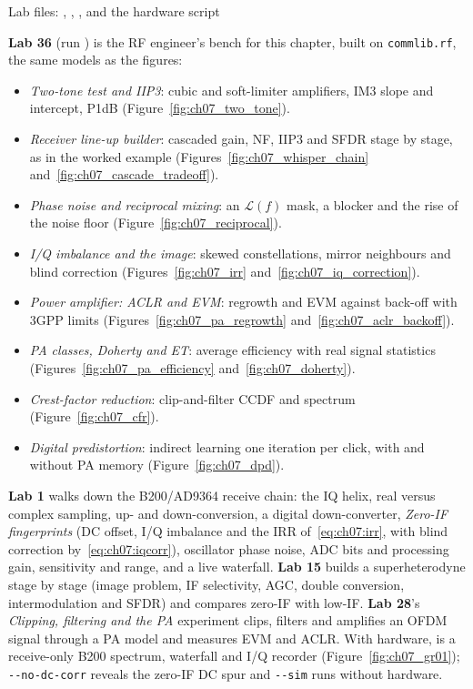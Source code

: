 \begin{labbox}
{\raggedright Lab files: ,
, ,  and the
hardware script \par}
\smallskip
\noindent\textbf{Lab 36} (run ) is the RF engineer's bench for this
chapter, built on \texttt{commlib.rf}, the same models as the figures:
\begin{itemize}
\item \emph{Two-tone test and IIP3}: cubic and soft-limiter amplifiers, IM3 slope and intercept, P1dB
(Figure~\ref{fig:ch07_two_tone}).
\item \emph{Receiver line-up builder}: cascaded gain, NF, IIP3 and SFDR stage by stage, as in the worked
example (Figures~\ref{fig:ch07_whisper_chain} and~\ref{fig:ch07_cascade_tradeoff}).
\item \emph{Phase noise and reciprocal mixing}: an $\mathcal L(f)$ mask, a blocker and the rise of the
noise floor (Figure~\ref{fig:ch07_reciprocal}).
\item \emph{I/Q imbalance and the image}: skewed constellations, mirror neighbours and blind correction
(Figures~\ref{fig:ch07_irr} and~\ref{fig:ch07_iq_correction}).
\item \emph{Power amplifier: ACLR and EVM}: regrowth and EVM against back-off with 3GPP limits
(Figures~\ref{fig:ch07_pa_regrowth} and~\ref{fig:ch07_aclr_backoff}).
\item \emph{PA classes, Doherty and ET}: average efficiency with real signal statistics
(Figures~\ref{fig:ch07_pa_efficiency} and~\ref{fig:ch07_doherty}).
\item \emph{Crest-factor reduction}: clip-and-filter CCDF and spectrum (Figure~\ref{fig:ch07_cfr}).
\item \emph{Digital predistortion}: indirect learning one iteration per click, with and without PA memory
(Figure~\ref{fig:ch07_dpd}).
\end{itemize}
\textbf{Lab 1} walks down the B200/AD9364 receive chain: the IQ helix, real versus complex sampling,
up- and down-conversion, a digital down-converter, \emph{Zero-IF fingerprints} (DC offset, I/Q imbalance and
the IRR of~\eqref{eq:ch07:irr}, with blind correction by~\eqref{eq:ch07:iqcorr}), oscillator phase noise,
ADC bits and processing gain, sensitivity and range, and a live waterfall. \textbf{Lab 15} builds a
superheterodyne stage by stage (image problem, IF selectivity, AGC, double conversion, intermodulation and
SFDR) and compares zero-IF with low-IF. \textbf{Lab 28}'s \emph{Clipping, filtering and the PA} experiment clips, filters and amplifies an OFDM
signal through a PA model and measures EVM and ACLR. With hardware, 
is a receive-only B200 spectrum, waterfall and I/Q recorder (Figure~\ref{fig:ch07_gr01});
\texttt{-{}-no-dc-corr} reveals the zero-IF DC spur and \texttt{-{}-sim} runs without hardware.
\end{labbox}

